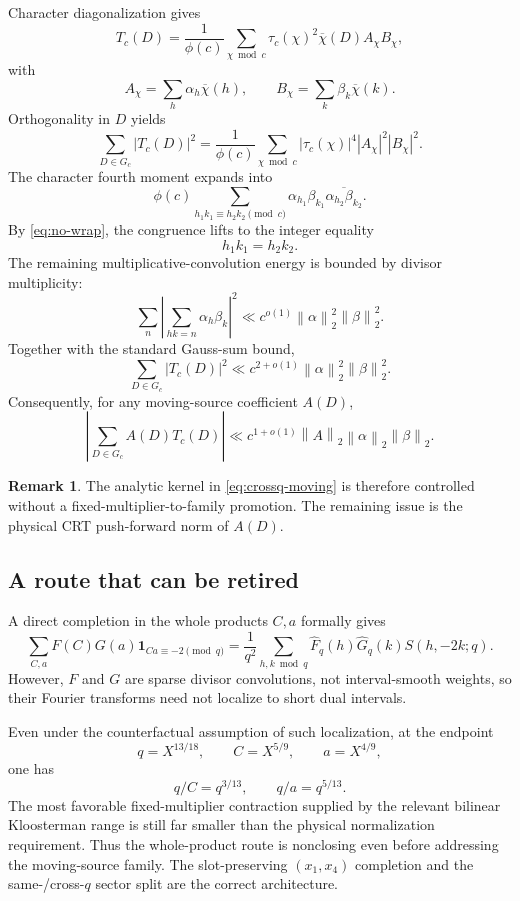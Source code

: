 \documentclass[11pt]{article}
\theoremstyle{definition}
\newtheorem{remark}[remark]{Remark}
\newcommand{\1}{\mathbf 1}
\newcommand{\norm}[1]{\left\lVert #1\right\rVert}
\begin{document}
Character diagonalization gives
\[
 T_c(D)
 =
 \frac1{\phi(c)}
 \sum_{\chi\bmod c}
 \tau_c(\chi)^2\overline{\chi}(D)A_\chi B_\chi,
\]
with
\[
  A_\chi=\sum_h\alpha_h\overline{\chi}(h),
  \qquad
  B_\chi=\sum_k\beta_k\overline{\chi}(k).
\]
Orthogonality in $D$ yields
\[
 \sum_{D\in G_c}|T_c(D)|^2
 =
 \frac1{\phi(c)}
 \sum_{\chi\bmod c}
 |\tau_c(\chi)|^4|A_\chi|^2|B_\chi|^2.
\]
The character fourth moment expands into
\[
 \phi(c)
 \sum_{h_1k_1\equiv h_2k_2\pmod c}
 \alpha_{h_1}\beta_{k_1}
 \overline{\alpha_{h_2}\beta_{k_2}}.
\]
By \eqref{eq:no-wrap}, the congruence lifts to the integer equality
\[
   h_1k_1=h_2k_2.
\]
The remaining multiplicative-convolution energy is bounded by divisor
multiplicity:
\[
 \sum_n\left|\sum_{hk=n}\alpha_h\beta_k\right|^2
 \ll
 c^{o(1)}
 \norm{\alpha}_2^2\norm{\beta}_2^2.
\]
Together with the standard Gauss-sum bound,
\begin{equation}
 \boxed{
 \sum_{D\in G_c}|T_c(D)|^2
 \ll
 c^{2+o(1)}
 \norm{\alpha}_2^2\norm{\beta}_2^2.
 }
 \label{eq:crossq-l2}
\end{equation}
Consequently, for any moving-source coefficient $A(D)$,
\begin{equation}
 \boxed{
 \left|\sum_{D\in G_c}A(D)T_c(D)\right|
 \ll
 c^{1+o(1)}
 \norm{A}_2\norm{\alpha}_2\norm{\beta}_2.
 }
 \label{eq:crossq-moving}
\end{equation}

\begin{remark}
The analytic kernel in \eqref{eq:crossq-moving} is therefore controlled
without a fixed-multiplier-to-family promotion.  The remaining issue is the
physical CRT push-forward norm of $A(D)$.
\end{remark}

\subsection{A route that can be retired}

A direct completion in the whole products $C,a$ formally gives
\[
 \sum_{C,a}F(C)G(a)\1_{Ca\equiv-2\pmod q}
 =
 \frac1{q^2}
 \sum_{h,k\bmod q}
 \widehat F_q(h)\widehat G_q(k)S(h,-2k;q).
\]
However, $F$ and $G$ are sparse divisor convolutions, not interval-smooth
weights, so their Fourier transforms need not localize to short dual
intervals.

Even under the counterfactual assumption of such localization, at the
endpoint
\[
 q=X^{13/18},\qquad C=X^{5/9},\qquad a=X^{4/9},
\]
one has
\[
 q/C=q^{3/13},\qquad q/a=q^{5/13}.
\]
The most favorable fixed-multiplier contraction supplied by the relevant
bilinear Kloosterman range is still far smaller than the physical
normalization requirement.  Thus the whole-product route is nonclosing even
before addressing the moving-source family.  The slot-preserving
$(x_1,x_4)$ completion and the same-/cross-$q$ sector split are the correct
architecture.
\end{document}
